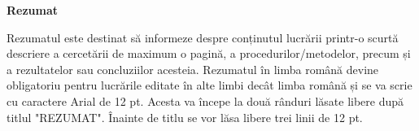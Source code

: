 \thispagestyle{pagestyle}

\begin{center}
    \textbf{\fontsize{20pt}{24pt} \selectfont Rezumat}
\end{center}

Rezumatul este destinat să informeze despre conținutul lucrării printr-o scurtă descriere a cercetării de maximum o pagină, a procedurilor/metodelor, precum și a rezultatelor sau concluziilor acesteia. Rezumatul în limba română devine obligatoriu pentru lucrările editate în alte limbi decât limba română și se va scrie cu caractere Arial de 12 pt. Acesta va începe la două rânduri lăsate libere după titlul "REZUMAT". Înainte de titlu se vor lăsa libere trei linii de 12 pt.

\vfill